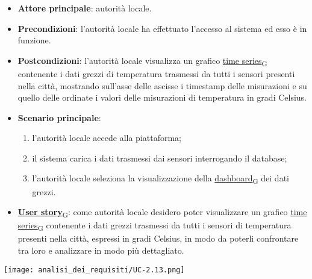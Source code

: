 \newpage
{}
\begin{itemize}
	\item \textbf{Attore principale}: autorità locale.
	\item \textbf{Precondizioni}: l'autorità locale ha effettuato l'accesso al sistema ed esso è in funzione.
	\item \textbf{Postcondizioni}: l'autorità locale visualizza un grafico \href{https://7last.github.io/docs/pb/documentazione-interna/glossario\#time-series}{time series\textsubscript{G}} contenente i dati grezzi di temperatura trasmessi da tutti i sensori presenti nella città, mostrando sull'asse delle ascisse i timestamp delle misurazioni e su quello delle ordinate i valori delle misurazioni di temperatura in gradi Celsius.
	\item \textbf{Scenario principale}:
	      \begin{enumerate}
		      \item l'autorità locale accede alla piattaforma;
		      \item il sistema carica i dati trasmessi dai sensori interrogando il database;
		      \item l'autorità locale seleziona la visualizzazione della \href{https://7last.github.io/docs/pb/documentazione-interna/glossario\#dashboard}{dashboard\textsubscript{G}} dei dati grezzi.
	      \end{enumerate}
	\item \href{https://7last.github.io/docs/pb/documentazione-interna/glossario\#user-story}{\textbf{User story}\textsubscript{G}}:
	      come autorità locale desidero poter visualizzare un grafico \href{https://7last.github.io/docs/pb/documentazione-interna/glossario\#time-series}{time series\textsubscript{G}} contenente i dati grezzi trasmessi da tutti i sensori
	      di temperatura presenti nella città, espressi in gradi Celsius, in modo da poterli confrontare tra loro e analizzare in modo più dettagliato.
\end{itemize}
\begin{center}
	\texttt{[image: analisi\_dei\_requisiti/UC-2.13.png]}
\end{center}

